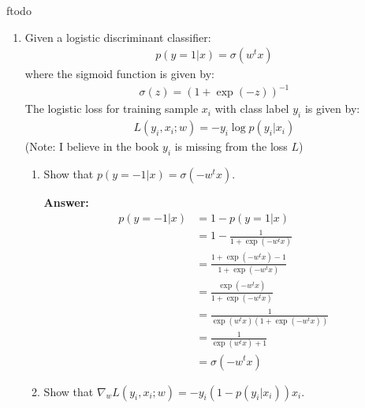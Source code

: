 ƒtodo\documentclass{article}
\newenvironment{QandA}{\begin{enumerate}[label=\arabic*.]}{\end{enumerate}}
\newenvironment{InnerQandA}{\begin{enumerate}[label=\roman*.]}{\end{enumerate}}
\newenvironment{answer}{\par\normalfont \textbf{Answer:}}{}
\begin{document}
\begin{QandA}
\begin{InnerQandA}
\begin{answer}
        (Source: \href{https://statproofbook.github.io/P/entcross-conv}{The Book of Statistical Proofs})
        \end{answer}
    \end{InnerQandA}

    \item Given a logistic discriminant classifier:
    \begin{align*}
        p(y=1 \vert x) = \sigma(w^tx)
    \end{align*}
    where the sigmoid function is given by:
    \begin{align*}
        \sigma(z) = (1 + \exp(-z))^{-1} 
    \end{align*}
    The logistic loss for training sample $x_i$ with class label $y_i$ is given by:
    \begin{align*}
        L(y_i, x_i; w) = -y_i \log p(y_i \vert x_i)
    \end{align*}
    (Note: I believe in the book $y_i$ is missing from the loss $L$)
    
    \begin{InnerQandA}
        \item Show that $p(y=-1 \vert x) = \sigma (-w^t x)$.
        \begin{answer}
            \begin{align*}
                p(y=-1 \vert x) &= 1 - p(y=1 \vert x) \\
                &= 1 - \frac{1}{1 + \exp(-w^tx)} \\
                &= \frac{1 + \exp(-w^tx) - 1}{1 + \exp(-w^tx)} \\ 
                &= \frac{\exp(-w^tx)}{1 + \exp(-w^tx)} \\ 
                &= \frac{1}{\exp(w^tx)(1 + \exp(-w^tx))} \\
                &= \frac{1}{\exp(w^tx) + 1} \\
                &= \sigma (-w^t x)
            \end{align*}
        \end{answer}

        \item Show that $\nabla_w L (y_i, x_i; w) = -y_i (1 - p(y_i \vert x_i))x_i$.


\end{InnerQandA}
\end{QandA}
\end{document}
